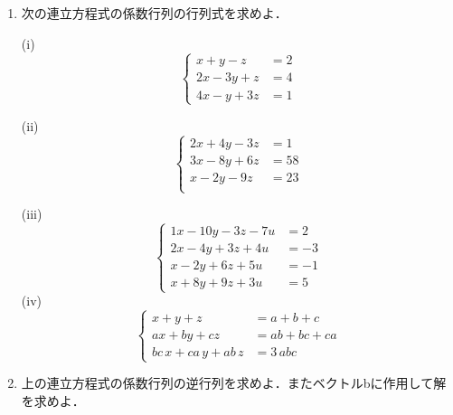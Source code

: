 \begin{enumerate}
\item
次の連立方程式の係数行列の行列式を求めよ．

(i)
\begin{equation*}
\left\{
\begin{array}{cc}x +y -z &=2 \\
2 x -3 y +z &=4  \\
4 x -y +3 z &=1  
\end{array} \right.
\end{equation*}

(ii)
\begin{equation*}
\left\{
\begin{array}{cl}2 x +4 y -3 z &=1   \\
3 x -8 y +6 z &=58   \\
x -2 y -9 z &=23   \\
\end{array} \right.
\end{equation*}

(iii)
\begin{equation*}
\left\{
\begin{array}{cl}
1 x -10 y -3 z -7 u &=2   \\
2 x -4 y +3 z +4 u &=-3   \\
x -2 y +6 z +5 u &=-1   \\
x +8 y +9 z +3 u &=5
\end{array} \right.
\end{equation*}
(iv)
\begin{equation*}
\left\{\begin{array}{cl}x +y +z &=a +b +c    \\
ax+by+cz &=ab +bc +ca   \\
bc\,x +ca\,y + ab\,z &=3\,abc 
\end{array} \right.
\end{equation*}

\item
上の連立方程式の係数行列の逆行列を求めよ．またベクトルbに作用して解を求めよ．
\end{enumerate}
